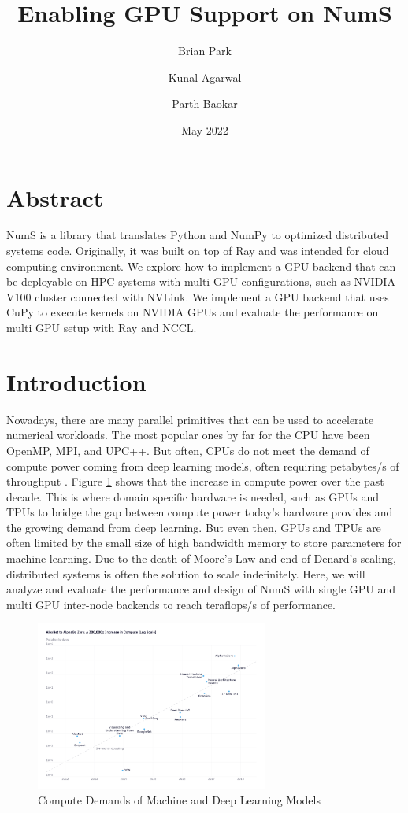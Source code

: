 \documentclass{article}
\title{Enabling GPU Support on NumS}
\author{Brian Park}
\author{Kunal Agarwal}
\author{Parth Baokar}
\affil{UC Berkeley, Computer Science 267}
\date{May 2022}
\begin{document}
\maketitle

\section*{Abstract}
NumS is a library that translates Python and NumPy to optimized distributed systems code. Originally, it was built on top of Ray and was intended for cloud computing environment. We explore how to implement a GPU backend that can be deployable on HPC systems with multi GPU configurations, such as NVIDIA V100 cluster connected with NVLink. We implement a GPU backend that uses CuPy to execute kernels on NVIDIA GPUs and evaluate the performance on multi GPU setup with Ray and NCCL.

\section{Introduction}
Nowadays, there are many parallel primitives that can be used to accelerate numerical workloads. The most popular ones by far for the CPU have been OpenMP, MPI, and UPC++. But often, CPUs do not meet the demand of compute power coming from deep learning models, often requiring petabytes/s of throughput \cite{openai}. Figure \ref{fig:openai} shows that the increase in compute power over the past decade. This is where domain specific hardware is needed, such as GPUs and TPUs to bridge the gap between compute power today's hardware provides and the growing demand from deep learning. But even then, GPUs and TPUs are often limited by the small size of high bandwidth memory to store parameters for machine learning. Due to the death of Moore's Law and end of Denard's scaling, distributed systems is often the solution to scale indefinitely. Here, we will analyze and evaluate the performance and design of NumS with single GPU and multi GPU inter-node backends to reach teraflops/s of performance.

\begin{figure}
	\centerline{\includegraphics[width=3in]{figures/ai-and-compute-modern-log.png}}
	\caption{Compute Demands of Machine and Deep Learning Models}
	\label{fig:openai}
\end{figure}
\end{document}
